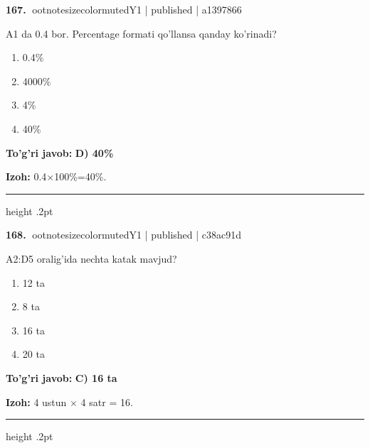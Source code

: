 \documentclass[10pt,a4paper]{article}
\begin{document}
\textbf{\color{ink}167.} {ootnotesizecolor{muted}Y1 | published | a1397866}
\par
A1 da 0.4 bor. Percentage formati qo'llansa qanday ko'rinadi?
\begin{enumerate}[label=\Alph*),leftmargin=9mm]
\item 0.4\%
\item 4000\%
\item 4\%
\item 40\%
\end{enumerate}
\begin{tcolorbox}[enhanced,breakable,colback=teal!4,colframe=teal!55!black,boxrule=0.45pt,arc=1.2mm,left=2.8mm,right=2.8mm,top=2mm,bottom=2mm]
\textbf{\color{teal}To'g'ri javob:} \textbf{D) 40\%}
\par\smallskip
\textbf{Izoh:} 0.4\ensuremath{\times}100\%=40\%.
\end{tcolorbox}
\vspace{2mm}\hrule height .2pt\vspace{2mm}

\textbf{\color{ink}168.} {ootnotesizecolor{muted}Y1 | published | c38ac91d}
\par
A2:D5 oralig'ida nechta katak mavjud?
\begin{enumerate}[label=\Alph*),leftmargin=9mm]
\item 12 ta
\item 8 ta
\item 16 ta
\item 20 ta
\end{enumerate}
\begin{tcolorbox}[enhanced,breakable,colback=teal!4,colframe=teal!55!black,boxrule=0.45pt,arc=1.2mm,left=2.8mm,right=2.8mm,top=2mm,bottom=2mm]
\textbf{\color{teal}To'g'ri javob:} \textbf{C) 16 ta}
\par\smallskip
\textbf{Izoh:} 4 ustun \ensuremath{\times} 4 satr = 16.
\end{tcolorbox}
\vspace{2mm}\hrule height .2pt\vspace{2mm}
\end{document}
